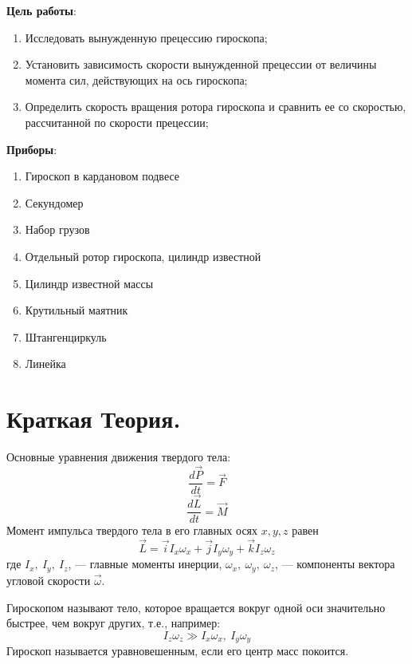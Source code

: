 \documentclass[a4paper,12pt]{article} %
\begin{document}

\textbf{Цель работы}:
\begin{enumerate}
\item Исследовать вынужденную прецессию гироскопа;
\item Установить зависимость скорости вынужденной прецессии от величины момента сил, действующих на ось гироскопа;
\item Определить скорость вращения ротора гироскопа и сравнить ее со скоростью, рассчитанной по скорости прецессии;
\end{enumerate}

\textbf{Приборы}:
\begin{enumerate}
\item Гироскоп в кардановом подвесе
\item Секундомер
\item Набор грузов
\item Отдельный ротор гироскопа, цилиндр известной
\item Цилиндр известной массы
\item Крутильный маятник
\item Штангенциркуль
\item Линейка
\end{enumerate}

\section{Краткая Теория.}

Основные уравнения движения твердого тела:
\begin {equation} \frac{d \vec{P}}{dt} = \vec{F} \label{eq:1} \end{equation}
\begin {equation} \frac{d \vec{L}}{dt} = \vec{M} \label{eq:2} \end{equation}
Момент импульса твердого тела в его главных осях $x, y, z$ равен
\begin {equation} \vec{L} = \vec{i} I_x \omega_x + \vec{j} I_y \omega_y + \vec{k} I_z \omega_z \label{eq:3} \end{equation}
где $I_x,\ I_y,\ I_z$, — главные моменты инерции, $\omega_x,\ \omega_y,\ \omega_z$, — компоненты
вектора угловой скорости $\vec{\omega}$.

Гироскопом называют тело, которое вращается вокруг одной оси значительно быстрее, чем вокруг других, т.е., например:
\[I_z \omega_z \gg I_x \omega_x,\ I_y \omega_y\]
Гироскоп называется уравновешенным, если его центр масс покоится.
\end{document}
